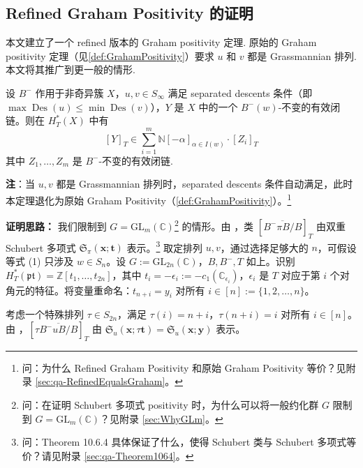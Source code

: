 \subsection{Refined Graham Positivity 的证明}
\label{sec:RefinedGrahamProof}

本文建立了一个 refined 版本的 Graham positivity 定理. 原始的 Graham positivity 定理（见\cref{def:GrahamPositivity}）要求 $u$ 和 $v$ 都是 Grassmannian 排列. 本文将其推广到更一般的情形.

\begin{Theorem}
\label{def:RefinedGraham}
设 $B^-$ 作用于非奇异簇 $X$，$u, v \in S_\infty$ 满足 separated descents 条件（即 $\max\operatorname{Des}(u) \leq \min\operatorname{Des}(v)$），$Y$ 是 $X$ 中的一个 $B^-(w)$-不变的有效闭链。则在 $H_T^*(X)$ 中有
$$[Y]_T \in \sum_{i=1}^m \mathbb{N}[-\alpha]_{\alpha \in I(w)} \cdot [Z_i]_T$$
其中 $Z_1, \ldots, Z_m$ 是 $B^-$-不变的有效闭链.
\end{Theorem}

\textbf{注}：当 $u, v$ 都是 Grassmannian 排列时，separated descents 条件自动满足，此时本定理退化为原始 Graham Positivity（\cref{def:GrahamPositivity}）。\footnote{问：为什么 Refined Graham Positivity 和原始 Graham Positivity 等价？见附录 \cref{sec:qa-RefinedEqualsGraham}。}

\label{def:Theorem1064}\textbf{证明思路：} 我们限制到 $G = \mathrm{GL}_m(\mathbb{C})$\footnote{问：在证明 Schubert 多项式 positivity 时，为什么可以将一般约化群 $G$ 限制到 $G = \mathrm{GL}_m(\mathbb{C})$？见附录 \cref{sec:WhyGLm}。} 的情形。由 \cite[Theorem 10.6.4]{anderson2023}，类 $[\overline{B^-\pi B/B}]_T$ 由双重 Schubert 多项式 $\mathfrak{S}_\pi(\mathbf{x}; \mathbf{t})$ 表示。\footnote{问：Theorem 10.6.4 具体保证了什么，使得 Schubert 类与 Schubert 多项式等价？请见附录 \cref{sec:qa-Theorem1064}。} 取定排列 $u, v$，通过选择足够大的 $n$，可假设等式 (1) 只涉及 $w \in S_n$。设 $G := \mathrm{GL}_{2n}(\mathbb{C})$，$B, B^-, T$ 如上。识别 $H_T^*(\mathfrak{pt}) = \mathbb{Z}[t_1, \ldots, t_{2n}]$，其中 $t_i = -\epsilon_i := -c_1(\mathbb{C}_{\epsilon_i})$，$\epsilon_i$ 是 $T$ 对应于第 $i$ 个对角元的特征。将变量重命名：$t_{n+i} = y_i$ 对所有 $i \in [n] := \{1, 2, \ldots, n\}$。

考虑一个特殊排列 $\tau \in S_{2n}$，满足 $\tau(i) = n + i$，$\tau(n + i) = i$ 对所有 $i \in [n]$。由 \cite[Section 16.5]{anderson2023}，$[\tau\overline{B^-uB/B}]_T$ 由 $\mathfrak{S}_u(\mathbf{x}; \tau\mathbf{t}) = \mathfrak{S}_u(\mathbf{x}; \mathbf{y})$ 表示。

